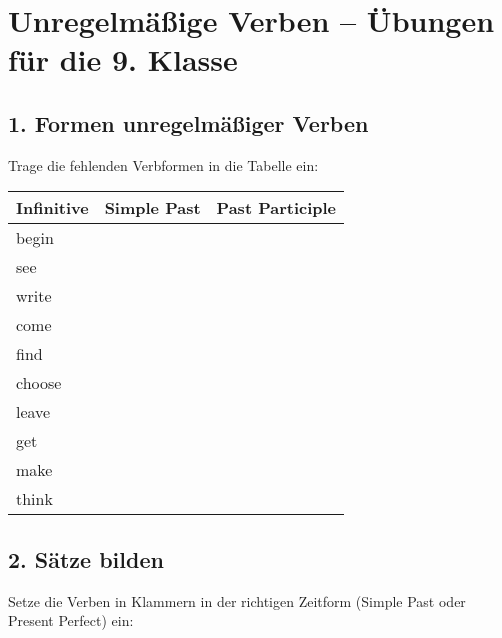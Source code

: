 
\section*{Unregelmäßige Verben – Übungen für die 9. Klasse}

\subsection*{1. Formen unregelmäßiger Verben}
Trage die fehlenden Verbformen in die Tabelle ein:

\begin{tabular}{|l|l|l|}
\hline
Infinitive & Simple Past & Past Participle \\
\hline
begin & & \\
see & & \\
write & & \\
come & & \\
find & & \\
choose & & \\
leave & & \\
get & & \\
make & & \\
think & & \\
\hline
\end{tabular}

\subsection*{2. Sätze bilden}
Setze die Verben in Klammern in der richtigen Zeitform (Simple Past oder Present Perfect) ein:

